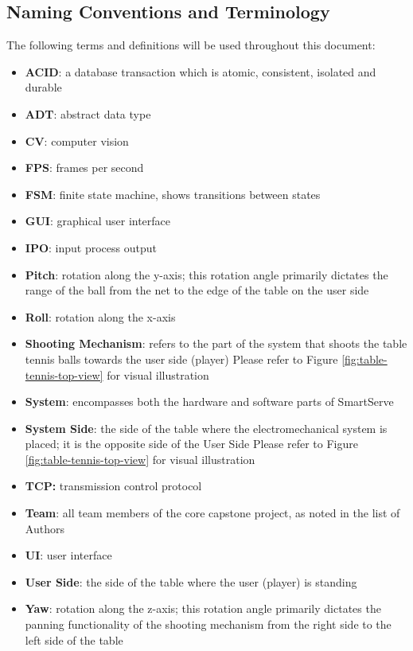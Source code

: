\documentclass[11pt]{article}
\begin{document}
\subsection{Naming Conventions and Terminology}
\label{sec:definitions}
The following terms and definitions will be used throughout this document:
\begin{itemize}
\item \textbf{ACID}: a database transaction which is atomic, consistent, isolated and durable
\item \textbf{ADT}: abstract data type
\item \textbf{CV}: computer vision
\item \textbf{FPS}: frames per second
\item \textbf{FSM}: finite state machine, shows transitions between states
\item \textbf{GUI}: graphical user interface
\item \textbf{IPO}: input process output
\item \textbf{Pitch}: rotation along the y-axis; this rotation angle primarily dictates the range of the ball from the net to the edge of the table on the user side
\item \textbf{Roll}: rotation along the x-axis
\item \textbf{Shooting Mechanism}: refers to the part of the system that shoots the table tennis balls towards the user side (player) Please refer to Figure \ref{fig:table-tennis-top-view} for visual illustration
\item \textbf{System}: encompasses both the hardware and software parts of SmartServe
\item \textbf{System Side}: the side of the table where the electromechanical system is placed; it is the opposite side of the User Side Please refer to Figure \ref{fig:table-tennis-top-view} for visual illustration
\item \textbf{TCP:} transmission control protocol
\item \textbf{Team}: all team members of the core capstone project, as noted in the list of Authors
\item \textbf{UI}: user interface
\item \textbf{User Side}: the side of the table where the user (player) is standing
\item \textbf{Yaw}: rotation along the z-axis; this rotation angle primarily dictates the panning functionality of the shooting mechanism from the right side to the left side of the table
\end{itemize}
\end{document}
